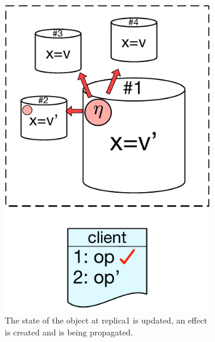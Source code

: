 \begin{figure}[t]
\begin{subfigure}[t]{0.31\textwidth}
	\includegraphics[scale=0.36]{Figures/system_model2.pdf}
        \caption{The state of the object at replica1 is updated, an
	effect is created and is being propagated.}
        \label{fig:sys_model2}
    \end{subfigure}
    \hfill
    \begin{subfigure}[t]{0.31\textwidth}
        \centering

\end{subfigure}
\end{figure}
